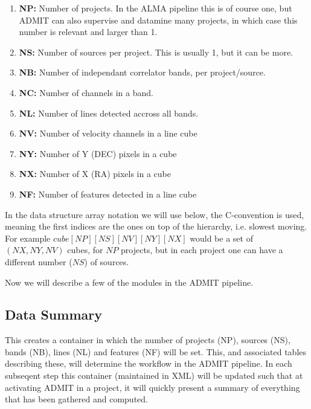 \documentclass[preprint]{aastex} %
\begin{document}
\begin{enumerate}

\item {\bf NP:}
Number of projects. In the ALMA pipeline this is of course one, but ADMIT
can also supervise and datamine many projects, in which case this number
is relevant and larger than 1.

\item {\bf NS:}
Number of sources per project. This is usually 1, but it can be more.

\item {\bf NB:}
Number of independant correlator bands, per project/source.

\item {\bf NC:}
Number of channels in a band.

\item {\bf NL:}
Number of lines detected accross all bands.

\item {\bf NV:}
Number of velocity channels in a line cube

\item {\bf NY:}
Number of Y (DEC) pixels in a cube

\item {\bf NX:}
Number of X (RA) pixels in a cube

\item {\bf NF:}
Number of features detected in a line cube

\end{enumerate}

In the data structure array notation we will use below, the C-convention is used, 
meaning the first indices are the ones on top of the hierarchy, i.e. slowest moving.
For example $cube[NP][NS][NV][NY][NX]$ would be a set of $(NX,NY,NV)$ cubes, 
for $NP$ projects, but in each project one can have a different number ($NS$) of
sources.

Now we will describe a few of the modules in the ADMIT pipeline.


\subsection{Data Summary}

This creates a container in which the number of projects (NP),
sources (NS), bands (NB), lines (NL) and features (NF) will be set. 
This, and 
associated tables describing these, will determine the workflow in the
ADMIT pipeline. In each subseqent step this container (maintained in XML) will
be updated such that at activating ADMIT in a project, it will quickly
present a summary of everything that has been gathered and computed. 
\end{document}
